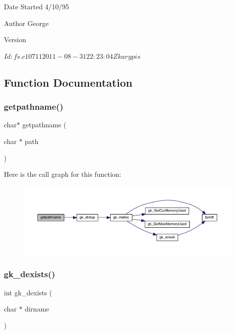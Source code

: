 \begin{DoxyDate}{Date}
Started 4/10/95 
\end{DoxyDate}
\begin{DoxyAuthor}{Author}
George 
\end{DoxyAuthor}
\begin{DoxyVersion}{Version}
\begin{DoxyVerb}$Id: fs.c 10711 2011-08-31 22:23:04Z karypis $ \end{DoxyVerb}
 
\end{DoxyVersion}


\subsection{Function Documentation}
\mbox{\label{a00035_abae64e0957b2369082de428989501f5f}} 
\subsubsection{\texorpdfstring{getpathname()}{getpathname()}}
{\footnotesize\ttfamily char$\ast$ getpathname (\begin{DoxyParamCaption}\item[{char $\ast$}]{path }\end{DoxyParamCaption})}

Here is the call graph for this function\+:\nopagebreak
\begin{figure}[H]
\begin{center}
\leavevmode
\includegraphics[width=350pt]{a00035_abae64e0957b2369082de428989501f5f_cgraph}
\end{center}
\end{figure}
\mbox{\label{a00035_ac489be391410e38e025f83cf013c90ca}} 
\subsubsection{\texorpdfstring{gk\+\_\+dexists()}{gk\_dexists()}}
{\footnotesize\ttfamily int gk\+\_\+dexists (\begin{DoxyParamCaption}\item[{char $\ast$}]{dirname }\end{DoxyParamCaption})}

